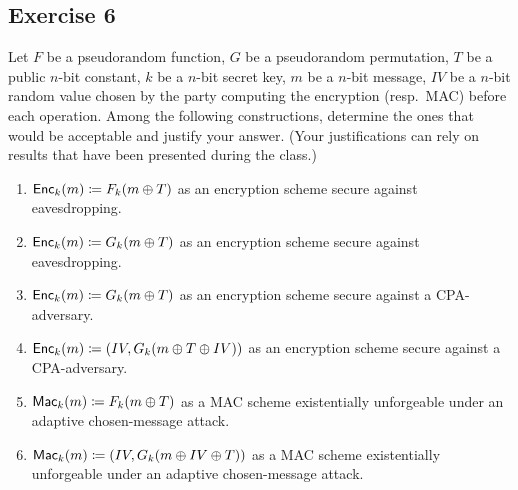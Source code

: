 \subsection{Exercise 6}

Let $F$ be a pseudorandom function, $G$ be a pseudorandom permutation, $T$ be a public $n$-bit constant, $k$ be a $n$-bit secret key, $m$ be a $n$-bit message, $IV$ be a $n$-bit random value chosen by the party computing the encryption (resp.~MAC) before each operation. Among the following constructions, determine the ones that would be acceptable and justify your answer. (Your justifications can rely on results that have been presented during the class.)

\begin{enumerate}
	\item $\operatorname{\mathsf{Enc}}_k(m) \coloneqq F_k(m \oplus T)$ as an encryption scheme secure against
	eavesdropping.

	\item $\operatorname{\mathsf{Enc}}_k(m) \coloneqq G_k(m \oplus T)$ as an encryption scheme secure against eavesdropping.

	\item $\operatorname{\mathsf{Enc}}_k(m) \coloneqq G_k(m \oplus T)$ as an encryption scheme secure against a CPA-adversary.

	\item $\operatorname{\mathsf{Enc}}_k(m) \coloneqq (IV,G_k(m \oplus T \oplus IV))$ as an encryption scheme secure against a CPA-adversary.

	\item $\operatorname{\mathsf{Mac}}_k(m) \coloneqq F_k(m \oplus T)$ as a MAC scheme existentially unforgeable under an
	adaptive chosen-message attack.

	\item $\operatorname{\mathsf{Mac}}_k(m) \coloneqq (IV,G_k(m\oplus IV \oplus T))$ as a MAC scheme
	existentially unforgeable under an adaptive chosen-message attack.
\end{enumerate}


